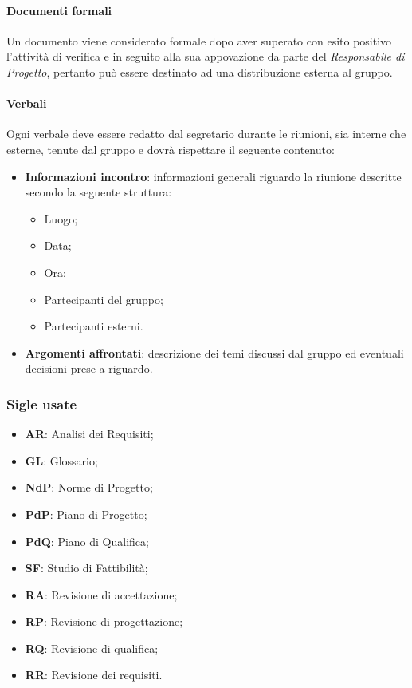 \paragraph{Documenti formali}
Un documento viene considerato formale dopo aver superato con esito positivo l'attività di verifica e in seguito alla sua appovazione da parte del \emph{Responsabile di Progetto}, pertanto può essere destinato ad una distribuzione esterna al gruppo.

\paragraph{Verbali} \Spazio
Ogni verbale deve essere redatto dal segretario durante le riunioni, sia interne che esterne, tenute dal gruppo e dovrà rispettare il seguente contenuto:
\begin{itemize}
	\item \textbf{Informazioni incontro}: informazioni generali riguardo la riunione descritte secondo la seguente struttura:
	\begin{itemize}
		\item Luogo;
		\item Data;
		\item Ora;
		\item Partecipanti del gruppo;
		\item Partecipanti esterni.
	\end{itemize}
	\item \textbf{Argomenti affrontati}: descrizione dei temi discussi dal gruppo ed eventuali decisioni prese a riguardo.
\end{itemize} 



\subsubsection{Sigle usate}
\begin{itemize}
	\item \textbf{AR}: Analisi dei Requisiti;
	\item \textbf{GL}: Glossario;
	\item \textbf{NdP}: Norme di Progetto;
	\item \textbf{PdP}: Piano di Progetto;
	\item \textbf{PdQ}: Piano di Qualifica;
	\item \textbf{SF}: Studio di Fattibilità;
	\item \textbf{RA}: Revisione di accettazione;
	\item \textbf{RP}: Revisione di progettazione;
	\item \textbf{RQ}: Revisione di qualifica;
	\item \textbf{RR}: Revisione dei requisiti.	
\end{itemize}


